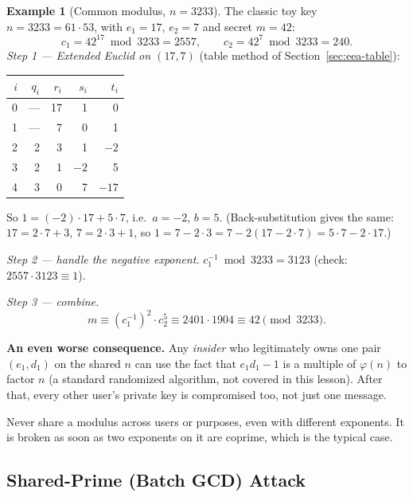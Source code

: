 \documentclass[11pt]{article}
\theoremstyle{definition}
\newtheorem{example}[theorem]{Example}
\theoremstyle{remark}
\newcommand{\hl}{\rowcolor{green!15}}   %
\begin{document}
\begin{example}[Common modulus, $n=3233$]\label{ex:commonmod}
The classic toy key $n=3233=61\cdot53$, with $e_1=17$, $e_2=7$ and secret $m=42$:
\[
c_1=42^{17}\bmod3233=2557,\qquad c_2=42^{7}\bmod3233=240.
\]
\emph{Step 1 --- Extended Euclid on $(17,7)$} (table method of Section~\ref{sec:eea-table}):
\begin{center}
\renewcommand{\arraystretch}{1.2}
\begin{tabular}{@{}rrrrr@{}}
\toprule
$i$ & $q_i$ & $r_i$ & $s_i$ & $t_i$ \\
\midrule
0 & --- & 17 & 1 & 0 \\
1 & --- & 7 & 0 & 1 \\
2 & 2 & 3 & 1 & $-2$ \\
\hl 3 & 2 & 1 & $-2$ & 5 \\
4 & 3 & 0 & 7 & $-17$ \\
\bottomrule
\end{tabular}
\end{center}
So $1=(-2)\cdot17+5\cdot7$, i.e.\ $a=-2$, $b=5$. (Back-substitution gives the same: $17=2\cdot7+3$, $7=2\cdot3+1$, so $1=7-2\cdot3=7-2(17-2\cdot7)=5\cdot7-2\cdot17$.)

\emph{Step 2 --- handle the negative exponent.} $c_1^{-1}\bmod3233=3123$ (check: $2557\cdot3123\equiv1$).

\emph{Step 3 --- combine.}
\[
m\equiv (c_1^{-1})^{2}\cdot c_2^{5} \equiv 2401\cdot1904 \equiv 42 \pmod{3233}.
\]
\end{example}

\textbf{An even worse consequence.} Any \emph{insider} who legitimately owns one pair $(e_1,d_1)$ on the shared $n$ can use the fact that $e_1d_1-1$ is a multiple of $\varphi(n)$ to factor $n$ (a standard randomized algorithm, not covered in this lesson). After that, every other user's private key is compromised too, not just one message.

\begin{fixbox}
Never share a modulus across users or purposes, even with different exponents. It is broken as soon as two exponents on it are coprime, which is the typical case.
\end{fixbox}

\subsection{Shared-Prime (Batch GCD) Attack}\label{sec:sharedprime}
\end{document}
